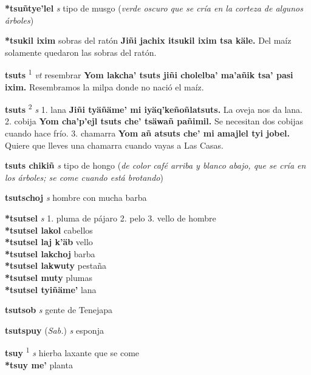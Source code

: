 \documentclass[10pt]{scrbook}
\newcommand{\entry}[1]{\textbf{#1}}
\newcommand{\onedefinition}[1]{#1.}
\newcommand{\defsuperscript}[1]{\textsuperscript{#1}}
\newcommand{\partofspeech}[1]{\textit{#1}}
\newcommand{\spanishtranslation}[1]{#1}
\newcommand{\clarification}[1]{(\textit{#1})}
\newcommand{\cholexample}[1]{\textbf{#1}}
\newcommand{\exampletranslation}[1]{#1}
\newcommand{\relevantdialect}[1]{(\textit{#1})}
\newcommand{\secondaryentry}[1]{\\\textbf{#1}}
\newcommand{\secondtranslation}[1]{#1}
\begin{document}
\begin{multicols}{2}
\entry{*tsuñtye'lel}
\partofspeech{s}
\spanishtranslation{tipo de musgo}
\clarification{verde oscuro que se cría en la corteza de algunos árboles}

\entry{*tsukil ixim}
\spanishtranslation{sobras del ratón}
\cholexample{Jiñi jachix itsukil ixim tsa käle.}
\exampletranslation{Del maíz solamente quedaron las sobras del ratón.}

\entry{tsuts}
\defsuperscript{1}
\partofspeech{vt}
\spanishtranslation{resembrar}
\cholexample{Yom lakcha' tsuts jiñi cholelba' ma'añik tsa' pasi ixim.}
\exampletranslation{Resembramos la milpa donde no nació el maíz.}

\entry{tsuts}
\defsuperscript{2}
\partofspeech{s}
\onedefinition{1}
\spanishtranslation{lana}
\cholexample{Jiñi tyäñäme' mi iyäq'keñoñlatsuts.}
\exampletranslation{La oveja nos da lana.}
\onedefinition{2}
\spanishtranslation{cobija}
\cholexample{Yom cha'p'ejl tsuts che' tsäwañ pañimil.}
\exampletranslation{Se necesitan dos cobijas cuando hace frío.}
\onedefinition{3}
\spanishtranslation{chamarra}
\cholexample{Yom añ atsuts che' mi amajlel tyi jobel.}
\exampletranslation{Quiere que lleves una chamarra cuando vayas a Las Casas.}

\entry{tsuts chikiñ}
\partofspeech{s}
\spanishtranslation{tipo de hongo}
\clarification{de color café arriba y blanco abajo, que se cría en los árboles; se come cuando está brotando}

\entry{tsutschoj}
\partofspeech{s}
\spanishtranslation{hombre con mucha barba}

\entry{*tsutsel}
\partofspeech{s}
\onedefinition{1}
\spanishtranslation{pluma de pájaro}
\onedefinition{2}
\spanishtranslation{pelo}
\onedefinition{3}
\spanishtranslation{vello de hombre}
\secondaryentry{*tsutsel lakol}
\secondtranslation{cabellos}
\secondaryentry{*tsutsel laj k'äb}
\secondtranslation{vello}
\secondaryentry{*tsutsel lakchoj}
\secondtranslation{barba}
\secondaryentry{*tsutsel lakwuty}
\secondtranslation{pestaña}
\secondaryentry{*tsutsel muty}
\secondtranslation{plumas}
\secondaryentry{*tsutsel tyiñäme'}
\secondtranslation{lana}

\entry{tsutsob}
\partofspeech{s}
\spanishtranslation{gente de Tenejapa}

\entry{tsutspuy}
\relevantdialect{Sab.}
\partofspeech{s}
\spanishtranslation{esponja}

\entry{tsuy}
\defsuperscript{1}
\partofspeech{s}
\spanishtranslation{hierba laxante que se come}
\secondaryentry{*tsuy me'}
\secondtranslation{planta}


\end{multicols}
\end{document}
